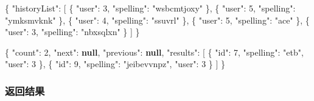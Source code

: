 \documentclass[
]{article}
\newenvironment{Shaded}{}{}
\newcommand{\DataTypeTok}[1]{\textcolor[rgb]{0.56,0.13,0.00}{#1}}
\newcommand{\DecValTok}[1]{\textcolor[rgb]{0.25,0.63,0.44}{#1}}
\newcommand{\FunctionTok}[1]{\textcolor[rgb]{0.02,0.16,0.49}{#1}}
\newcommand{\KeywordTok}[1]{\textcolor[rgb]{0.00,0.44,0.13}{\textbf{#1}}}
\newcommand{\OtherTok}[1]{\textcolor[rgb]{0.00,0.44,0.13}{#1}}
\newcommand{\StringTok}[1]{\textcolor[rgb]{0.25,0.44,0.63}{#1}}
\begin{document}
\begin{Shaded}
\begin{Highlighting}[]
\FunctionTok{\{}
  \DataTypeTok{"historyList"}\FunctionTok{:} \OtherTok{[}
    \FunctionTok{\{}
      \DataTypeTok{"user"}\FunctionTok{:} \DecValTok{3}\FunctionTok{,}
      \DataTypeTok{"spelling"}\FunctionTok{:} \StringTok{"wsbcmtjoxy"}
    \FunctionTok{\}}\OtherTok{,}
    \FunctionTok{\{}
      \DataTypeTok{"user"}\FunctionTok{:} \DecValTok{5}\FunctionTok{,}
      \DataTypeTok{"spelling"}\FunctionTok{:} \StringTok{"ymksmvknk"}
    \FunctionTok{\}}\OtherTok{,}
    \FunctionTok{\{}
      \DataTypeTok{"user"}\FunctionTok{:} \DecValTok{4}\FunctionTok{,}
      \DataTypeTok{"spelling"}\FunctionTok{:} \StringTok{"ssuvrl"}
    \FunctionTok{\}}\OtherTok{,}
    \FunctionTok{\{}
      \DataTypeTok{"user"}\FunctionTok{:} \DecValTok{5}\FunctionTok{,}
      \DataTypeTok{"spelling"}\FunctionTok{:} \StringTok{"ace"}
    \FunctionTok{\}}\OtherTok{,}
    \FunctionTok{\{}
      \DataTypeTok{"user"}\FunctionTok{:} \DecValTok{3}\FunctionTok{,}
      \DataTypeTok{"spelling"}\FunctionTok{:} \StringTok{"nbxsqlxn"}
    \FunctionTok{\}}
  \OtherTok{]}
\FunctionTok{\}}
\end{Highlighting}
\end{Shaded}

\begin{Shaded}
\begin{Highlighting}[]
\FunctionTok{\{}
  \DataTypeTok{"count"}\FunctionTok{:} \DecValTok{2}\FunctionTok{,}
  \DataTypeTok{"next"}\FunctionTok{:} \KeywordTok{null}\FunctionTok{,}
  \DataTypeTok{"previous"}\FunctionTok{:} \KeywordTok{null}\FunctionTok{,}
  \DataTypeTok{"results"}\FunctionTok{:} \OtherTok{[}
    \FunctionTok{\{}
      \DataTypeTok{"id"}\FunctionTok{:} \DecValTok{7}\FunctionTok{,}
      \DataTypeTok{"spelling"}\FunctionTok{:} \StringTok{"etb"}\FunctionTok{,}
      \DataTypeTok{"user"}\FunctionTok{:} \DecValTok{3}
    \FunctionTok{\}}\OtherTok{,}
    \FunctionTok{\{}
      \DataTypeTok{"id"}\FunctionTok{:} \DecValTok{9}\FunctionTok{,}
      \DataTypeTok{"spelling"}\FunctionTok{:} \StringTok{"jeibevvnpz"}\FunctionTok{,}
      \DataTypeTok{"user"}\FunctionTok{:} \DecValTok{3}
    \FunctionTok{\}}
  \OtherTok{]}
\FunctionTok{\}}
\end{Highlighting}
\end{Shaded}

\hypertarget{ux8fd4ux56deux7ed3ux679c-35}{%
\subsubsection{返回结果}\label{ux8fd4ux56deux7ed3ux679c-35}}
\end{document}

